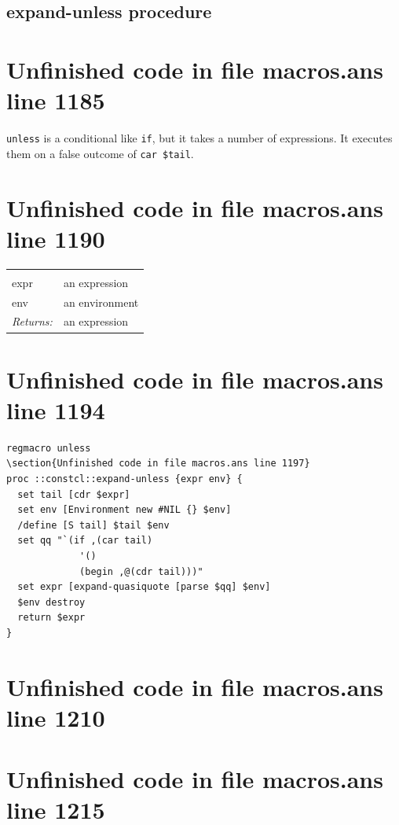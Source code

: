 \documentclass[twoside,9pt]{report}
\begin{document}
\subsection{expand-unless procedure}
\label{expand-unless-procedure}
\section{Unfinished code in file macros.ans line 1185}


\texttt{unless} is a conditional like \texttt{if}, but it takes a number of expressions. It executes them on a false outcome of \texttt{car \$tail}.

\section{Unfinished code in file macros.ans line 1190}
\noindent\begin{tabular}{ |p{1.9cm} p{8cm}| }
\hline
\rowcolor[HTML]{CCCCCC} \multicolumn{2}{|l|}{\bf expand-unless (internal)} \\
expr & an expression \\
env & an environment \\
\textit{Returns:} & an expression \\
\hline
\end{tabular}
\section{Unfinished code in file macros.ans line 1194}
\begin{lstlisting}
regmacro unless
\section{Unfinished code in file macros.ans line 1197}
proc ::constcl::expand-unless {expr env} {
  set tail [cdr $expr]
  set env [Environment new #NIL {} $env]
  /define [S tail] $tail $env
  set qq "`(if ,(car tail)
             '()
             (begin ,@(cdr tail)))"
  set expr [expand-quasiquote [parse $qq] $env]
  $env destroy
  return $expr
}
\end{lstlisting}
\section{Unfinished code in file macros.ans line 1210}
\section{Unfinished code in file macros.ans line 1215}
\end{document}
